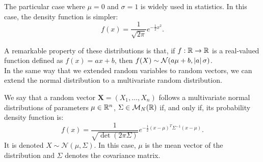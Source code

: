 The particular case where $\mu = 0$ and $\sigma = 1$ is widely used in statistics. In this case, the density function is simpler:
\[
f(x) = \frac{1}{\sqrt{2\pi}}e^{-\frac{1}{2}x^2}.
\]

A remarkable property of these distributions is that, if $f : \mathbb{R} \to \mathbb{R}$ is a real-valued function defined 
as $f(x) = ax+b$, then $f(X) \sim \mathcal N (a\mu + b, \left\lvert a\right\rvert \sigma)$.\\

In the same way that we extended random variables to random vectors, we can extend the normal distribution to a multivariate
random distribution.

\begin{ndef}
We say that a random vector $\bm{X} = (X_1,\dots,X_n)$ follows a multivariate normal distributions of parameters
$\mu \in \mathbb{R}^n$, $\Sigma \in \mathcal M_N(\mathbb{R})$ if, and only if, its probability density function is:
\begin{equation*}\label{gaussian:function:vector}
f(x) = \frac{1}{\sqrt{\det(2\pi \Sigma)}}e^{-\frac{1}{2}(x - \mu )^T \Sigma^{-1} (x-\mu)}.
\end{equation*}
It is denoted $X \sim \mathcal N(\mu, \Sigma)$.
In this case, $\mu$ is the mean vector of the distribution and $\Sigma$ denotes the covariance matrix.  
\end{ndef}
